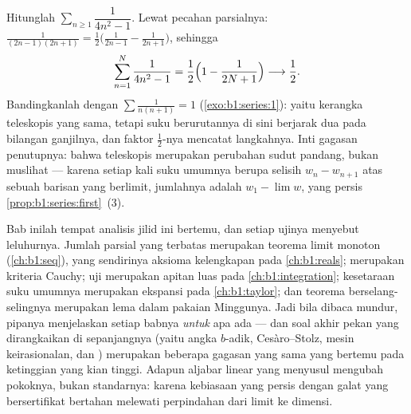 \begin{example}\label{ex:b1:series:oddtelescope}
Hitunglah $\sum_{n \geq 1} \dfrac{1}{4n^2 - 1}$. Lewat pecahan
parsialnya: $\frac{1}{(2n-1)(2n+1)} =
\frac12\bigl(\frac{1}{2n-1} - \frac{1}{2n+1}\bigr)$, sehingga
\[
\sum_{n=1}^{N} \frac{1}{4n^2 - 1}
= \frac12\Bigl(1 - \frac{1}{2N+1}\Bigr)
\longrightarrow \frac12 .
\]
Bandingkanlah dengan $\sum \frac{1}{n(n+1)} = 1$
(\cref{exo:b1:series:1}): yaitu kerangka teleskopis yang sama, tetapi
suku berurutannya di sini berjarak dua pada bilangan ganjilnya, dan
faktor $\frac12$-nya mencatat langkahnya. Inti gagasan penutupnya:
bahwa teleskopis merupakan perubahan sudut pandang, bukan muslihat --- karena setiap kali
suku umumnya berupa selisih $w_n - w_{n+1}$ atas sebuah barisan
yang berlimit, jumlahnya adalah $w_1 - \lim w$, yang persis
\cref{prop:b1:series:first}~(3).
\end{example}

\begin{remark}
Bab inilah tempat analisis jilid ini bertemu, dan setiap
ujinya menyebut leluhurnya. Jumlah parsial yang terbatas merupakan teorema limit
monoton (\cref{ch:b1:seq}), yang sendirinya aksioma kelengkapan
pada \cref{ch:b1:reals};  merupakan kriteria
Cauchy; uji  merupakan apitan luas pada
\cref{ch:b1:integration}; kesetaraan suku umumnya merupakan
ekspansi pada \cref{ch:b1:taylor}; dan teorema berselang-selingnya merupakan
lema  dalam pakaian Minggunya. Jadi bila dibaca
mundur, pipanya menjelaskan setiap babnya \emph{untuk} apa
ada --- dan soal akhir pekan yang dirangkaikan di sepanjangnya
(yaitu angka $b$-adik, Cesàro--Stolz, mesin keirasionalan, dan
) merupakan beberapa gagasan yang sama yang bertemu pada ketinggian
yang kian tinggi. Adapun aljabar linear yang menyusul mengubah
pokoknya, bukan standarnya: karena kebiasaan  yang persis dengan
galat yang bersertifikat bertahan melewati perpindahan dari limit ke dimensi.
\end{remark}

